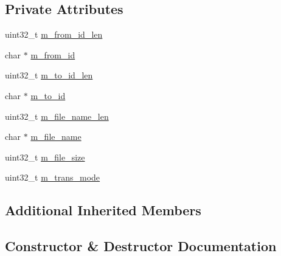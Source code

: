 \subsection*{Private Attributes}
\begin{DoxyCompactItemize}
\item 
uint32\+\_\+t \hyperlink{class_c_im_pdu_client_file_request_afa5226eac8907f1ad6c48004f2d46ff4}{m\+\_\+from\+\_\+id\+\_\+len}
\item 
char $\ast$ \hyperlink{class_c_im_pdu_client_file_request_a6c5406cac918f8fec22afe7f9e67dde8}{m\+\_\+from\+\_\+id}
\item 
uint32\+\_\+t \hyperlink{class_c_im_pdu_client_file_request_aad74bc8b502f463e9b4ed4166a1956e3}{m\+\_\+to\+\_\+id\+\_\+len}
\item 
char $\ast$ \hyperlink{class_c_im_pdu_client_file_request_a220d354d5cdf8777b605c239b19ba799}{m\+\_\+to\+\_\+id}
\item 
uint32\+\_\+t \hyperlink{class_c_im_pdu_client_file_request_a15fc4d8622dec78426e0dc8dcf98ca2f}{m\+\_\+file\+\_\+name\+\_\+len}
\item 
char $\ast$ \hyperlink{class_c_im_pdu_client_file_request_a5220e0b456d91943dfeca581697c1828}{m\+\_\+file\+\_\+name}
\item 
uint32\+\_\+t \hyperlink{class_c_im_pdu_client_file_request_ab15c4bf485a235ff1bd37ce9ea14987a}{m\+\_\+file\+\_\+size}
\item 
uint32\+\_\+t \hyperlink{class_c_im_pdu_client_file_request_a4d65456017c9c998519d1c28a7ac5614}{m\+\_\+trans\+\_\+mode}
\end{DoxyCompactItemize}
\subsection*{Additional Inherited Members}


\subsection{Constructor \& Destructor Documentation}
\hypertarget{class_c_im_pdu_client_file_request_a1ecbf4833d396beed2c382f78086141d}{}
